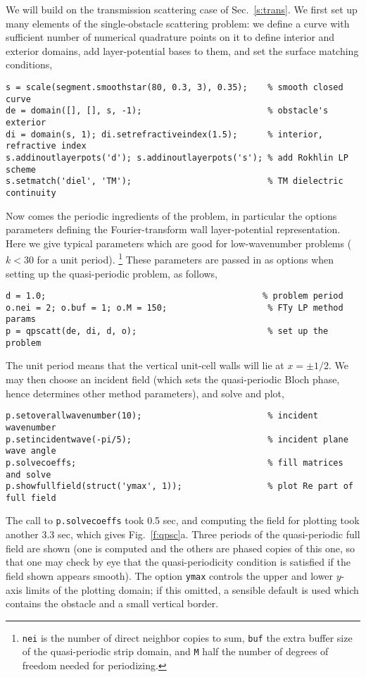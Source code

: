 We will build on the transmission scattering case of
Sec.~\ref{s:trans}.
We first set up many elements of the single-obstacle scattering problem:
we define a curve with sufficient number of
numerical quadrature points on it to define interior and exterior domains,
add layer-potential bases to them, and set the surface matching conditions,
\begin{verbatim}
s = scale(segment.smoothstar(80, 0.3, 3), 0.35);    % smooth closed curve
de = domain([], [], s, -1);                         % obstacle's exterior
di = domain(s, 1); di.setrefractiveindex(1.5);      % interior, refractive index
s.addinoutlayerpots('d'); s.addinoutlayerpots('s'); % add Rokhlin LP scheme 
s.setmatch('diel', 'TM');                           % TM dielectric continuity
\end{verbatim}
Now comes the periodic ingredients of the problem, in particular the
options parameters defining the Fourier-transform wall layer-potential
representation.
Here we give typical parameters which are good for low-wavenumber problems
($k<30$ for a unit period).
\footnote{{\tt nei} is the number of direct neighbor copies to sum,
{\tt buf} the extra buffer size of the quasi-periodic strip domain,
and {\tt M} half the number of degrees of freedom needed for periodizing.}
These parameters are passed in as options
when setting up the quasi-periodic problem, as follows,
\begin{verbatim}
d = 1.0;                                           % problem period
o.nei = 2; o.buf = 1; o.M = 150;                    % FTy LP method params
p = qpscatt(de, di, d, o);                          % set up the problem
\end{verbatim}
The unit period means that the vertical unit-cell walls will lie at $x=\pm 1/2$.
We may then choose an incident field (which sets the quasi-periodic
Bloch phase, hence determines other method parameters), and solve and plot,
\begin{verbatim}
p.setoverallwavenumber(10);                         % incident wavenumber
p.setincidentwave(-pi/5);                           % incident plane wave angle
p.solvecoeffs;                                      % fill matrices and solve
p.showfullfield(struct('ymax', 1));                 % plot Re part of full field
\end{verbatim}
The call to {\tt p.solvecoeffs} %
took 0.5 sec, and
computing the field for plotting took another 3.3 sec,
which gives Fig.~\ref{f:qpsc}a.
Three periods of the quasi-periodic full field are shown
(one is computed and the others are phased copies of this one,
so that one may check by eye that the quasi-periodicity condition is
satisfied if the field shown appears smooth).
The option {\tt ymax} controls the upper and lower $y$-axis
limits of the plotting domain; if this omitted, a sensible default is
used which contains the obstacle and a small vertical border.


